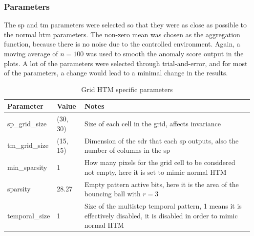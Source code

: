 \subsubsection{Parameters}
The \gls*{sp} and \gls*{tm} parameters were selected so that they were as close as possible to the normal \gls*{htm} parameters. The non-zero mean was chosen as the aggregation function, because there is no noise due to the controlled environment. Again, a moving average of $n=100$ was used to smooth the anomaly score output in the plots. A lot of the parameters were selected through trial-and-error, and for most of the parameters, a change would lead to a minimal change in the results.
\begin{table}[H]
    \centering
    \begin{tabularx}{\linewidth}{@{}XlX@{}}
        \toprule
        \textbf{Parameter} & \textbf{Value} & \textbf{Notes}                                                                                                          \\
        \midrule
        sp\_grid\_size     & (30, 30)       & Size of each cell in the grid, affects invariance                                                                       \\
        tm\_grid\_size     & (15, 15)       & Dimension of the \gls*{sdr} that each \gls*{sp}    outputs, also the number of columns in the \gls*{sp}                 \\
        min\_sparsity      & 1              & How many pixels for the grid cell to be considered not empty, here it is set to mimic normal HTM                        \\
        sparsity           & 28.27          & Empty pattern active bits, here it is the area of the bouncing ball with $r=3$                                          \\
        temporal\_size     & 1              & Size of the multistep temporal pattern, 1 means it is effectively disabled, it is disabled in order to mimic normal HTM \\
        \bottomrule
    \end{tabularx}
    \caption{Grid HTM specific parameters}
    \label{tab:bb_gridhtm_params}
\end{table}
